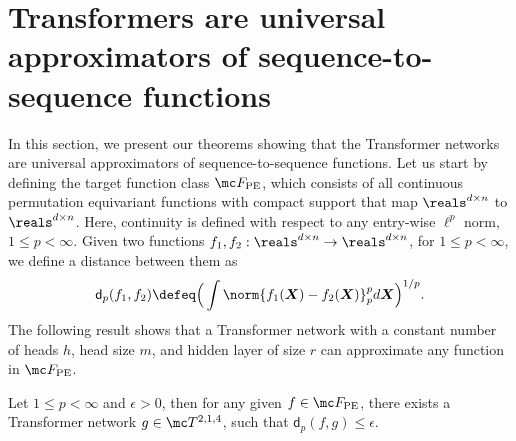 \documentclass{article} %
\def\mX{{\bm{X}}}
\newcommand{\funcdist}{\mathsf{d}}
\begin{document}
\section{Transformers are universal approximators of sequence-to-sequence functions}
\vspace*{-4pt}
\label{sec:main}


In this section, we present our theorems showing that the Transformer networks are universal approximators of sequence-to-sequence functions. Let us start by defining the target function class $\mc F_{\rm PE}$, which consists of all continuous permutation equivariant functions with compact support that map $\reals^{d \times n}$ to $\reals^{d \times n}$. Here, continuity is defined with respect to any entry-wise $\ell^p$ norm, $1 \leq p < \infty$. Given two functions $f_1, f_2 : \reals^{d\times n} \to \reals^{d \times n}$, for $1 \leq p < \infty$, we define a distance between them as
$$
\funcdist_p(f_1,f_2) \defeq \Big (\int \norm{f_1(\mX) - f_2(\mX)}_p^p d\mX \Big )^{1/p}.
$$
The following result shows that a Transformer network with a constant number of heads $h$, head size $m$, and hidden layer of size $r$ can approximate any function in $\mc F_{\rm PE}$.

\begin{theorem}
\label{thm:univapprox}
Let $1 \leq p < \infty$ and $\epsilon > 0$, then for any given $f \in \mc F_{\rm PE}$, there exists a Transformer network $g \in \mc T^{2,1,4}$, such that $\funcdist_p(f,g) \leq \epsilon$. 
\end{theorem}

\end{document}

